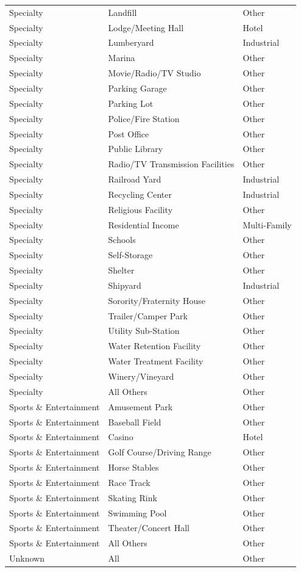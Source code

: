 \documentclass[
  12pt]{article}
\begin{document}
\begin{longtable}[]{@{}lll@{}}
Specialty & Landfill & Other \\
Specialty & Lodge/Meeting Hall & Hotel \\
Specialty & Lumberyard & Industrial \\
Specialty & Marina & Other \\
Specialty & Movie/Radio/TV Studio & Other \\
Specialty & Parking Garage & Other \\
Specialty & Parking Lot & Other \\
Specialty & Police/Fire Station & Other \\
Specialty & Post Office & Other \\
Specialty & Public Library & Other \\
Specialty & Radio/TV Transmission Facilities & Other \\
Specialty & Railroad Yard & Industrial \\
Specialty & Recycling Center & Industrial \\
Specialty & Religious Facility & Other \\
Specialty & Residential Income & Multi-Family \\
Specialty & Schools & Other \\
Specialty & Self-Storage & Other \\
Specialty & Shelter & Other \\
Specialty & Shipyard & Industrial \\
Specialty & Sorority/Fraternity House & Other \\
Specialty & Trailer/Camper Park & Other \\
Specialty & Utility Sub-Station & Other \\
Specialty & Water Retention Facility & Other \\
Specialty & Water Treatment Facility & Other \\
Specialty & Winery/Vineyard & Other \\
Specialty & All Others & Other \\
Sports \& Entertainment & Amusement Park & Other \\
Sports \& Entertainment & Baseball Field & Other \\
Sports \& Entertainment & Casino & Hotel \\
Sports \& Entertainment & Golf Course/Driving Range & Other \\
Sports \& Entertainment & Horse Stables & Other \\
Sports \& Entertainment & Race Track & Other \\
Sports \& Entertainment & Skating Rink & Other \\
Sports \& Entertainment & Swimming Pool & Other \\
Sports \& Entertainment & Theater/Concert Hall & Other \\
Sports \& Entertainment & All Others & Other \\
Unknown & All & Other \\
\end{longtable}
\end{document}

